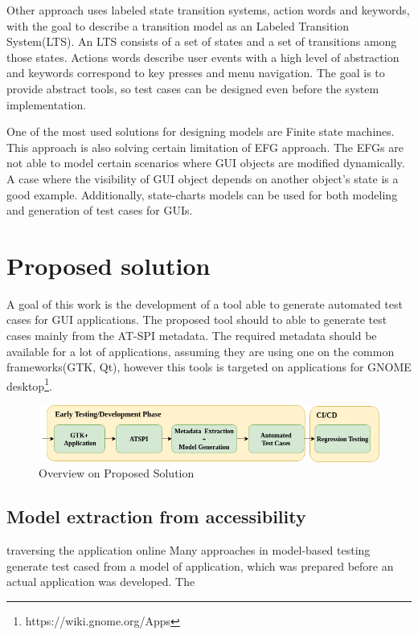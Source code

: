 Other approach uses labeled state transition systems, action words and keywords, with the goal to describe a transition model as an Labeled Transition System(LTS). An LTS consists of a set of states and a set of transitions among those states. Actions words describe user events with a high level of abstraction and keywords correspond to key presses and menu navigation. The goal is to provide abstract tools, so test cases can be designed even before the system implementation. 

One of the most used solutions for designing models are Finite state machines. This approach is also solving certain limitation of EFG approach. The EFGs are not able to model certain scenarios where GUI objects are modified dynamically. A case where the visibility of GUI object depends on another object's state is a good example. Additionally, state-charts models can be used for both modeling and generation of test cases for GUIs.

\cite{embedded}

\chapter{Proposed solution}
A goal of this work is the development of a tool able to generate automated test cases for GUI applications. The proposed tool should to able to generate test cases mainly from the AT-SPI metadata. The required metadata should be available for a lot of applications, assuming they are using one on the common frameworks(GTK, Qt), however this tools is targeted on applications for GNOME desktop\footnote{https://wiki.gnome.org/Apps}. 


\begin{figure}[hbt]
	\centering
	\includegraphics[width=1\textwidth]{obrazky-figures/diagram.png}
	\caption{Overview on Proposed Solution}
	\label{Diagram}
\end{figure}

\section{Model extraction from accessibility}
traversing the application online
Many approaches in model-based testing generate test cased from a model of application, which was prepared before an actual application was developed. The
